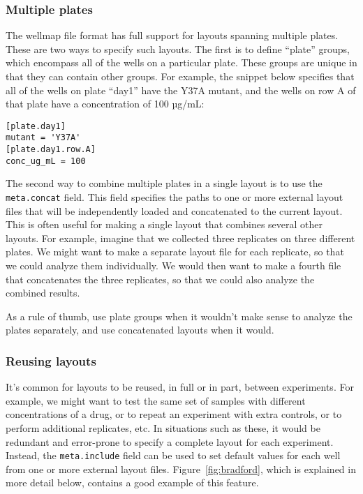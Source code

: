 \documentclass[twocolumn]{bmcart}
\begin{document}
\subsubsection*{Multiple plates}

The wellmap file format has full support for layouts spanning multiple
plates. These are two ways to specify such layouts. The first is to
define ``plate'' groups, which encompass all of the wells on a particular
plate. These groups are unique in that they can contain other groups.
For example, the snippet below specifies that all of the wells on
plate ``day1'' have the Y37A mutant, and the wells on row A of that
plate have a concentration of 100 µg/mL:

\begin{lstlisting}
[plate.day1]
mutant = 'Y37A'
[plate.day1.row.A]
conc_ug_mL = 100
\end{lstlisting}

The second way to combine multiple plates in a single layout is to
use the \texttt{meta.concat} field. This field specifies the paths
to one or more external layout files that will be independently loaded
and concatenated to the current layout. This is often useful for making
a single layout that combines several other layouts. For example,
imagine that we collected three replicates on three different plates.
We might want to make a separate layout file for each replicate, so
that we could analyze them individually. We would then want to make
a fourth file that concatenates the three replicates, so that we could
also analyze the combined results.

As a rule of thumb, use plate groups when it wouldn't make sense to
analyze the plates separately, and use concatenated layouts when it
would.

\subsubsection*{Reusing layouts}

It's common for layouts to be reused, in full or in part, between
experiments. For example, we might want to test the same set of samples
with different concentrations of a drug, or to repeat an experiment
with extra controls, or to perform additional replicates, etc. In
situations such as these, it would be redundant and error-prone to
specify a complete layout for each experiment. Instead, the \texttt{meta.include}
field can be used to set default values for each well from one or
more external layout files. Figure~\ref{fig:bradford}, which is
explained in more detail below, contains a good example of this feature.
\end{document}
